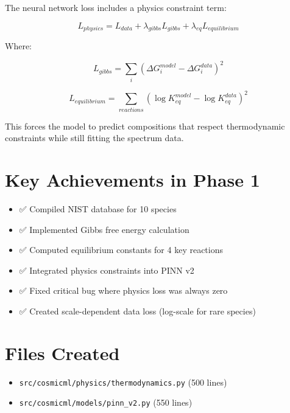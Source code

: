\documentclass[12pt,a4paper,oneside]{report}
\begin{document}
The neural network loss includes a physics constraint term:

\begin{equation}
L_{physics} = L_{data} + \lambda_{gibbs} L_{gibbs} + \lambda_{eq} L_{equilibrium}
\label{eq:physics_loss}
\end{equation}

Where:

\begin{equation}
L_{gibbs} = \sum_i \left(\Delta G_i^{model} - \Delta G_i^{data}\right)^2
\label{eq:gibbs_loss}
\end{equation}

\begin{equation}
L_{equilibrium} = \sum_{reactions} \left(\log K_{eq}^{model} - \log K_{eq}^{data}\right)^2
\label{eq:equilibrium_loss}
\end{equation}

This forces the model to predict compositions that respect thermodynamic constraints while still fitting the spectrum data.

\section{Key Achievements in Phase 1}

\begin{itemize}
    \item ✅ Compiled NIST database for 10 species
    \item ✅ Implemented Gibbs free energy calculation
    \item ✅ Computed equilibrium constants for 4 key reactions
    \item ✅ Integrated physics constraints into PINN v2
    \item ✅ Fixed critical bug where physics loss was always zero
    \item ✅ Created scale-dependent data loss (log-scale for rare species)
\end{itemize}

\section{Files Created}

\begin{itemize}
    \item \texttt{src/cosmicml/physics/thermodynamics.py} (500 lines)
    \item \texttt{src/cosmicml/models/pinn\_v2.py} (550 lines)
\end{itemize}
\end{document}
